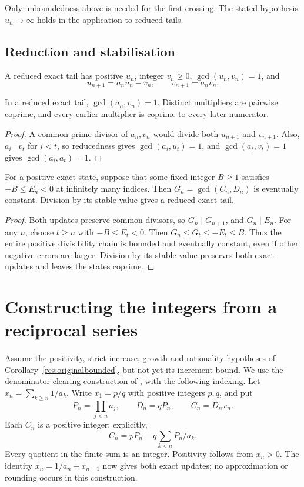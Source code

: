 \documentclass[11pt]{article}
\begin{document}
Only unboundedness above is needed for the first crossing. The stated
hypothesis $u_n\to\infty$ holds in the application to reduced tails.

\subsection{Reduction and stabilisation}
A reduced exact tail has positive $u_n$, integer $v_n\ge0$,
$\gcd(u_n,v_n)=1$, and
\[
 u_{n+1}=a_nu_n-v_n,\qquad v_{n+1}=a_nv_n.
\]
\begin{proposition}\label{res:reduced}
In a reduced exact tail, $\gcd(a_n,v_n)=1$. Distinct multipliers are
pairwise coprime, and every earlier multiplier is coprime to every later
numerator.
\end{proposition}
\begin{proof}
A common prime divisor of $a_n,v_n$ would divide both $u_{n+1}$ and
$v_{n+1}$. Also, $a_i\mid v_t$ for $i<t$, so reducedness gives
$\gcd(a_i,u_t)=1$, and $\gcd(a_t,v_t)=1$ gives
$\gcd(a_i,a_t)=1$.
\end{proof}

\begin{proposition}\label{res:gcdstab}
For a positive exact state, suppose that some fixed integer $B\ge1$
satisfies $-B\le E_n<0$ at infinitely many indices. Then
$G_n=\gcd(C_n,D_n)$ is eventually constant. Division by its stable value
gives a reduced exact tail.
\end{proposition}
\begin{proof}
Both updates preserve common divisors, so $G_n\mid G_{n+1}$, and
$G_n\mid E_n$. For any $n$, choose $t\ge n$ with $-B\le E_t<0$.
Then $G_n\le G_t\le -E_t\le B$. Thus the entire positive divisibility
chain is bounded and eventually constant, even if other negative errors
are larger. Division by its stable value preserves both exact updates
and leaves the states coprime.
\end{proof}

\section{Constructing the integers from a reciprocal series}\label{sec:transfer}
Assume the positivity, strict increase, growth and rationality hypotheses
of Corollary~\ref{res:originalbounded}, but not yet its increment bound.
We use the denominator-clearing construction of
\cite[Lemma~4, pp.~11--12]{koizumi2025}, with the following indexing.
Let $x_n=\sum_{k\ge n}1/a_k$. Write $x_1=p/q$ with positive integers
$p,q$, and put
\[
 P_n=\prod_{j<n}a_j,\qquad D_n=qP_n,\qquad C_n=D_nx_n.
\]
Each $C_n$ is a positive integer: explicitly,
\[
 C_n=pP_n-q\sum_{k<n}P_n/a_k.
\]
Every quotient in the finite sum is an integer. Positivity follows from
$x_n>0$. The identity $x_n=1/a_n+x_{n+1}$ now gives both exact updates;
no approximation or rounding occurs in this construction.
\end{document}
